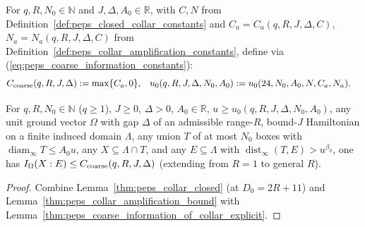\begin{definition}
    \label{def:peps_closed_coarse_constants}
    \leanok
    For $q,R,N_0\in\mathbb N$ and $J,\Delta,A_0\in\mathbb R$, with $C,N$ from Definition~\ref{def:peps_closed_collar_constants} and $C_a=C_a(q,R,J,\Delta,C)$, $N_a=N_a(q,R,J,\Delta,C)$ from Definition~\ref{def:peps_collar_amplification_constants}, define via (\ref{eq:peps_coarse_information_constants}):
    \begin{align}
        C_{\rm coarse}(q,R,J,\Delta) & := \max\{C_a,0\},                    &
        u_0(q,R,J,\Delta,N_0,A_0)    & := u_0(24,N_0,A_0,N,C_a,N_a). \notag
    \end{align}
\end{definition}

\begin{lemma}
    \label{thm:peps_coarse_information_closed}
    \leanok
    For $q,R,N_0\in\mathbb N$ ($q\ge1$), $J\ge0$, $\Delta>0$, $A_0\in\mathbb R$, $u\ge u_0(q,R,J,\Delta,N_0,A_0)$, any unit ground vector $\Omega$ with gap $\Delta$ of an admissible range-$R$, bound-$J$ Hamiltonian on a finite induced domain $\Lambda$, any union $T$ of at most $N_0$ boxes with $\operatorname{diam}_\infty T\le A_0u$, any $X\subseteq\Lambda\cap T$, and any $E\subseteq\Lambda$ with $\operatorname{dist}_\infty(T,E)>u^{\beta_0}$, one has $I_\Omega(X:E)\le C_{\rm coarse}(q,R,J,\Delta)$ (extending \cite[Proposition~3.1]{OpenAI2026PolynomialPEPS} from $R=1$ to general $R$).
\end{lemma}
\begin{proof}
    \leanok
    Combine Lemma~\ref{thm:peps_collar_closed} (at $D_0=2R+11$) and Lemma~\ref{thm:peps_collar_amplification_bound} with Lemma~\ref{thm:peps_coarse_information_of_collar_explicit}.
\end{proof}
